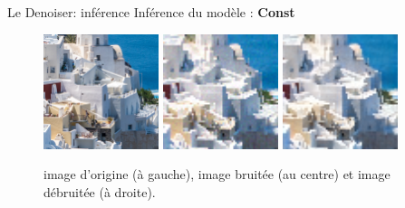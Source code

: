 \documentclass[11pt]{beamer}
\begin{document}
\begin{frame}{Le Denoiser: inférence}
    Inférence du modèle : \textbf{Const}
    \begin{figure}[b]
        \centering
        \includegraphics[width=0.30\textwidth]{../images/original/0823.png}
        \includegraphics[width=0.30\textwidth]{../images/constant_blured/0823.png}
        \includegraphics[width=0.30\textwidth]{../images/constant_infer/0823.png}
        \caption{image d'origine (à gauche), image bruitée (au centre) et image débruitée (à droite).}
    \end{figure}
\end{frame}
\end{document}
